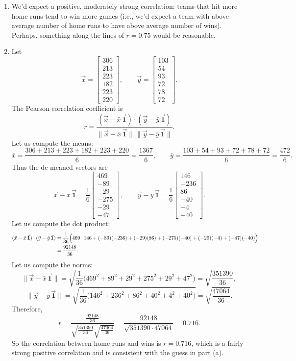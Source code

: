 \documentclass[10pt]{extarticle}
\begin{document}
\begin{enumerate}[label=(\alph*)]
\item We'd expect a positive, moderately strong correlation: teams that hit more home runs tend to win more games (i.e., we'd expect a team with above average number of home runs to have above average number of wins). Perhaps, something along the lines of $r=0.75$ would be reasonable.
\item Let
\[
\vec{x}=\begin{bmatrix}306\\213\\223\\182\\223\\220\end{bmatrix},\qquad
\vec{y}=\begin{bmatrix}103\\54\\93\\72\\78\\72\end{bmatrix}.
\]
The Pearson correlation coefficient is
\[
r=\frac{(\vec{x}-\bar x\,\vec{\mathbf{1}})\cdot (\vec{y}-\bar y\,\vec{\mathbf{1}})}{\|\vec{x}-\bar x\,\vec{\mathbf{1}}\|\,\|\vec{y}-\bar y\,\vec{\mathbf{1}}\|}.
\]
Let us compute the means:
\[
\bar x=\frac{306+213+223+182+223+220}{6}=\frac{1367}{6},
\qquad
\bar y=\frac{103+54+93+72+78+72}{6}=\frac{472}{6}.
\]
Thus the de-meaned vectors are
\[
\vec{x}-\bar x\,\vec{\mathbf{1}}
=
\frac{1}{6}
\begin{bmatrix}
469\\
-89\\
-29\\
-275\\
-29\\
-47
\end{bmatrix},
\qquad
\vec{y}-\bar y\,\vec{\mathbf{1}}
=
\frac{1}{6}
\begin{bmatrix}
146\\
-236\\
86\\
-40\\
-4\\
-40
\end{bmatrix}.
\]
Let us compute the dot product:
\begin{align}
(\vec{x}-\bar x\,\vec{\mathbf{1}})\cdot (\vec{y}-\bar y\,\vec{\mathbf{1}})
&=\frac{1}{36}\Big(469\cdot146+(-89)(-236)+(-29)(86)+(-275)(-40)+(-29)(-4)+(-47)(-40)\Big) \notag \\
&=\frac{92148}{36}.
\end{align}
Let us compute the norms:
\[
\|\vec{x}-\bar x\,\vec{\mathbf{1}}\|
=
\sqrt{\frac{1}{36}\Big(469^2+89^2+29^2+275^2+29^2+47^2\Big)}
=
\sqrt{\frac{351390}{36}},
\]
\[
\|\vec{y}-\bar y\,\vec{\mathbf{1}}\|
=
\sqrt{\frac{1}{36}\Big(146^2+236^2+86^2+40^2+4^2+40^2\Big)}
=
\sqrt{\frac{47064}{36}}.
\]
Therefore,
\[
r
=
\frac{\frac{92148}{36}}{\sqrt{\frac{351390}{36}}\sqrt{\frac{47064}{36}}}
=
\frac{92148}{\sqrt{351390\cdot47064}}=0.716.
\]
So the correlation between home runs and wins is $\boxed{r=0.716}$, which is a fairly strong positive correlation and is consistent with the guess in part (a).
\end{enumerate}
\end{document}
